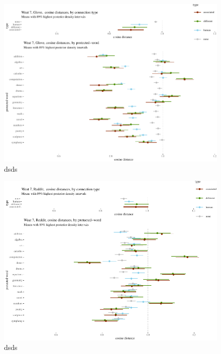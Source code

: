 \documentclass[
  10pt,
  dvipsnames,enabledeprecatedfontcommands]{scrartcl}
\begin{document}
\begin{figure}


\begin{center}\includegraphics[width=1.1\linewidth]{paperDraft6_files/figure-latex/unnamed-chunk-2-1} \end{center}
\caption{dsds}
\label{fig:weat7glove}
\end{figure}

\begin{figure}


\begin{center}\includegraphics[width=1.1\linewidth]{paperDraft6_files/figure-latex/unnamed-chunk-3-1} \end{center}
\caption{dsds}
\label{fig:weat7reddit}
\end{figure}
\end{document}
